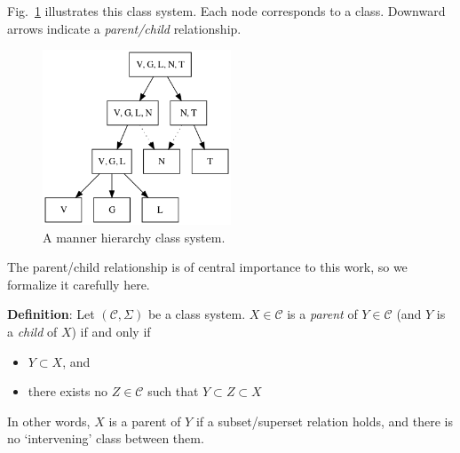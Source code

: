 \documentclass[11pt, oneside]{article}   	%
\begin{document}
\noindent Fig.~\ref{fig:manner_input} illustrates this class system. Each node corresponds to a class. Downward arrows indicate a \textit{parent/child} relationship.

\begin{figure}[h]
  \centering
  \includegraphics[width=0.5\textwidth]{manner_poset_privative.png}
  \caption{A manner hierarchy class system.}
  \label{fig:manner_input}
\end{figure}

\vspace{\baselineskip} \noindent The parent/child relationship is of central importance to this work, so we formalize it carefully here.

\vspace{\baselineskip} \noindent \textbf{Definition}: Let $(\mathcal C, \Sigma)$ be a class system. $X \in \mathcal C$ is a \textit{parent} of $Y \in \mathcal C$ (and $Y$ is a \textit{child} of $X$) if and only if \begin{itemize}
    \item $Y \subset X$, and
    \item there exists no $Z \in \mathcal C$ such that $Y \subset Z \subset X$
    \end{itemize}
In other words, $X$ is a parent of $Y$ if a subset/superset relation holds, and there is no `intervening' class between them. 
\end{document}
